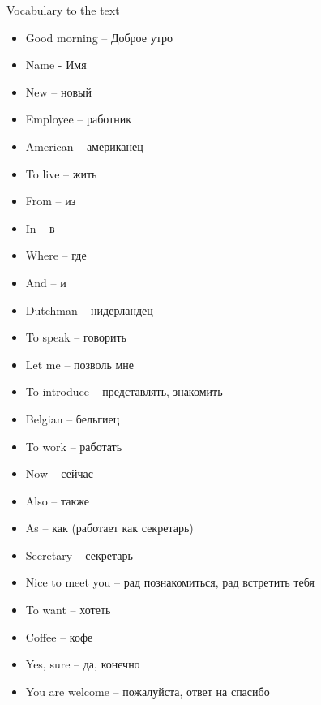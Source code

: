 \documentclass{tstextbook}
\begin{document}
\begin{example} Vocabulary to the text
	\label{def:vocabulary_1}
	\begin{itemize}
		\item Good morning -- Доброе утро
		\item Name - Имя
		\item New -- новый
		\item Employee -- работник
		\item American -- американец
		\item To live -- жить	
		\item From -- из
		\item In -- в
		\item Where -- где
		\item And -- и
		\item Dutchman -- нидерландец
		\item To speak -- говорить
		\item Let me -- позволь мне
		\item To introduce -- представлять, знакомить
		\item Belgian -- бельгиец
		\item To work -- работать
		\item Now -- сейчас
		\item Also -- также
		\item As -- как (работает как секретарь)
		\item Secretary -- секретарь
		\item Nice to meet you -- рад познакомиться, рад встретить тебя
		\item To want -- хотеть
		\item Coffee -- кофе
		\item Yes, sure -- да, конечно
		\item You are welcome -- пожалуйста, ответ на спасибо
	\end{itemize}
\end{example}

	
	
	
	
	\printindex
	
\end{document}
